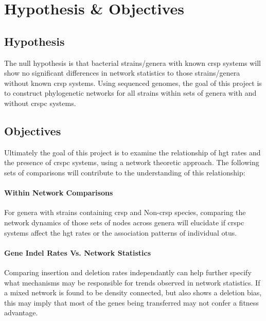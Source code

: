 \section{Hypothesis \& Objectives}
\subsection{Hypothesis}
The null hypothesis is that bacterial strains/genera with known \ac{crsp} systems will show no significant differences in network statistics to those strains/genera without known \ac{crsp} systems.
Using sequenced genomes, the goal of this project is to construct phylogenetic networks for all strains within sets of genera with and without \ac{crspc} systems.
\subsection{Objectives}
Ultimately the goal of this project is to examine the relationship of \ac{hgt} rates and the presence of \ac{crspc} systems, using a network theoretic approach. The following sets of comparisons will contribute to the understanding of this relationship:
\paragraph*{Within Network Comparisons}%
For genera with strains containing \ac{crsp} and Non-\ac{crsp} species, comparing the network dynamics of those sets of nodes across genera will elucidate if \ac{crspc} systems affect the \ac{hgt} rates or the association patterns of individual \ac{otu}s.
\paragraph*{Gene Indel Rates Vs. Network Statistics}%
Comparing insertion and  deletion rates independantly can help further specify what mechanisms may be responsible for trends observed in network statistics.
If a mixed network is found to be density connected, but also shows a deletion bias, this may imply that most of the genes being transferred may not confer a fitness advantage.
